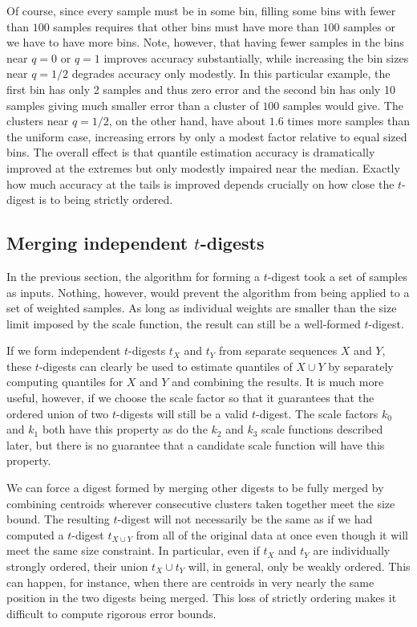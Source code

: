 \documentclass[]{statsoc}
\begin{document}
Of course, since every sample must be in some bin, filling some bins with fewer than $100$ samples requires that other bins must have more than $100$ samples or we have to have more bins. Note, however, that having fewer samples in the bins near $q=0$ or $q=1$ improves accuracy substantially, while increasing the bin sizes near $q=1/2$ degrades accuracy only modestly. In this particular example, the first bin has only 2 samples and thus zero error and the second bin has only 10 samples giving much smaller error than a cluster of $100$ samples would give. The clusters near $q=1/2$, on the other hand, have about $1.6$ times more samples than the uniform case, increasing errors by only a modest factor relative to equal sized bins. The overall effect is that quantile estimation accuracy is dramatically improved at the extremes but only modestly impaired near the median. Exactly how much accuracy at the tails is improved depends crucially on how close the $t$-digest is to being strictly ordered.

\subsection{Merging independent $t$-digests}
In the previous section, the algorithm for forming a $t$-digest took a set of samples as inputs. Nothing, however, would prevent the algorithm from being applied to a set of weighted samples. As long as individual weights are smaller than the size limit imposed by the scale function, the result can still be a well-formed $t$-digest.

If we form independent $t$-digests $t_X$ and $t_Y$ from separate sequences $X$ and $Y$, these $t$-digests can clearly be used to estimate quantiles of $X \cup Y$ by separately computing quantiles for $X$ and $Y$ and combining the results. It is much more useful, however, if we choose the scale factor so that it guarantees that the ordered union of two $t$-digests will still be a valid $t$-digest. The scale factors $k_0$ and $k_1$ both have this property as do the $k_2$ and $k_3$ scale functions described later, but there is no guarantee that a candidate scale function will have this property.

We can force a  digest formed by merging other digests to be fully merged by combining  centroids wherever consecutive clusters taken together meet the size bound. The resulting $t$-digest will not necessarily be the same as if we had computed a $t$-digest $t_{X \cup Y}$ from all of the original data at once even though it will meet the same size constraint. In particular, even if $t_X$ and $t_Y$ are individually strongly ordered, their union $t_X \cup t_Y$ will, in general, only be weakly ordered. This can happen, for instance, when there are centroids in very nearly the same position in the two digests being merged. This loss of strictly ordering makes it difficult to compute rigorous error bounds.
\end{document}

